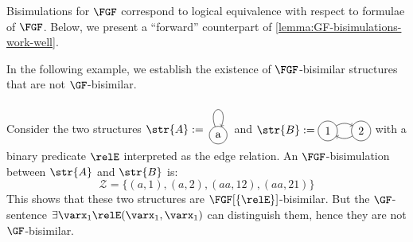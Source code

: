 Bisimulations for $\FGF$ correspond to logical equivalence with respect to formulae of $\FGF$.
Below, we present a ``forward'' counterpart of \cref{lemma:GF-bisimulations-work-well}.


\noindent
In the following example, we establish the existence of $\FGF$-bisimilar structures that are not $\GF$-bisimilar.
\begin{example}
  Consider the two structures
  $\str{A} := \tikz[baseline=0.5ex]{\path (0pt,-2.5ex) -- (0pt,-2.5ex); \path[->] (0,0) node[draw,circle] (n1) {a} (n1) edge[loop above,in=70,out=110,looseness=10] (n1);}$ and
  $\str{B} := \tikz[baseline=-0.5ex]{\path[->] (0,0) node (n1) [draw,circle] {1} (3em,0) node (n2) [draw,circle] {2} (n1) edge[bend left] (n2) (n2) edge[bend left] (n1);}$
  with a binary predicate $\relE$ interpreted as the edge relation.
  An $\FGF$-bisimulation between $\str{A}$ and $\str{B}$ is:
  \begin{equation*}
  \mathcal{Z} = \{ (a,1), (a,2), (aa,12), (aa, 21) \}
  \end{equation*}
  This shows that these two structures are $\FGF[\{\relE\}]$-bisimilar.
  But the $\GF$-sentence $\exists{\varx_1}\relE(\varx_1,\varx_1)$ can distinguish them, hence they are not $\GF$-bisimilar.
\end{example}

